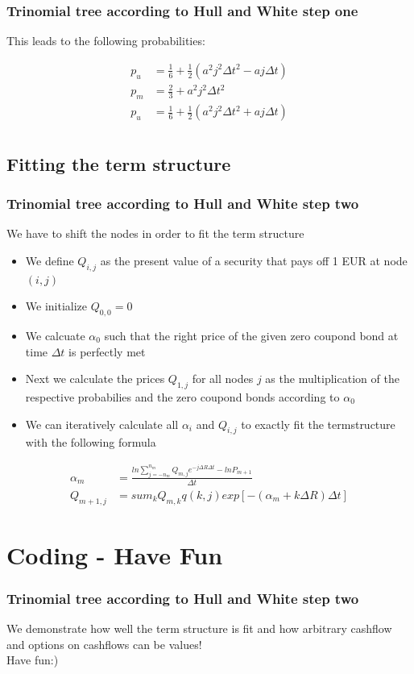 \documentclass{beamer}
\begin{document}
\begin{frame}
\frametitle{Trinomial tree according to Hull and White step one} 

This leads to the following probabilities:

\begin{align*}
p_u &= \frac{1}{6} + \frac{1}{2}(a^2j^2 \Delta t^2 - a j \Delta t)\\
p_m &= \frac{2}{3} + a^2j^2 \Delta t^2 \\
p_u &= \frac{1}{6} + \frac{1}{2}(a^2j^2 \Delta t^2 + a j \Delta t)\\
\end{align*}

\end{frame}



\subsection{Fitting the term structure}
\begin{frame}
\frametitle{Trinomial tree according to Hull and White step two} 
\vspace{0.4cm}
We have to shift the nodes in order to fit the term structure
\begin{itemize}
\item We define $Q_{i,j}$ as the present value of a security that pays off 1 EUR at node $(i,j)$
\item We initialize $Q_{0,0} = 0$
\item We calcuate $\alpha_0$ such that the right price of the given zero coupond bond at time $\Delta t$ is perfectly met
\item Next we calculate the prices $Q_{1,j}$ for all nodes $j$ as the multiplication of the respective probabilies and the zero coupond bonds according to $\alpha_0$
\item We can iteratively calculate all $\alpha_i$ and $Q_{i,j}$ to exactly fit the termstructure with the following formula
\end{itemize}

\vspace{-0.6cm}

\begin{align*}
\alpha_m &= \frac{ln \sum_{j=-n_m}^{n_m} Q_{m,j} e^{-j\Delta R \Delta t} - ln P_{m+1}}{\Delta t}\\
Q_{m+1,j} &= sum_k Q_{m,k}q(k,j) exp[-(\alpha_m + k \Delta R) \Delta t]
\end{align*}

\end{frame}



\section{Coding - Have Fun}

\begin{frame}
\frametitle{Trinomial tree according to Hull and White step two} 
We demonstrate how well the term structure is fit and how arbitrary cashflow and options on cashflows can be values!\\
Have fun:)
\end{frame}
\end{document}
